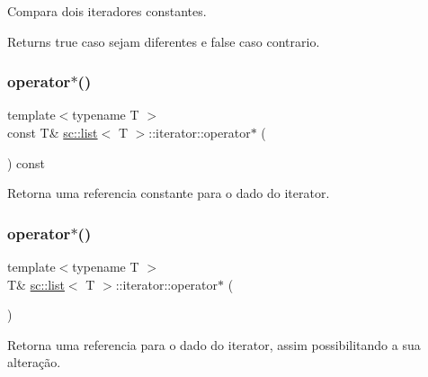 Compara dois iteradores constantes. \begin{DoxyReturn}{Returns}
true caso sejam diferentes e false caso contrario. 
\end{DoxyReturn}
\mbox{\label{classsc_1_1list_1_1iterator_a8e1feb979567a3fa27add54563d0008f}} 
\subsubsection{\texorpdfstring{operator$\ast$()}{operator*()}\hspace{0.1cm}{\footnotesize\ttfamily [1/2]}}
{\footnotesize\ttfamily template$<$typename T $>$ \\
const T\& \hyperlink{classsc_1_1list}{sc\+::list}$<$ T $>$\+::iterator\+::operator$\ast$ (\begin{DoxyParamCaption}{ }\end{DoxyParamCaption}) const\hspace{0.3cm}{\ttfamily [inline]}}

Retorna uma referencia constante para o dado do iterator. \mbox{\label{classsc_1_1list_1_1iterator_a2d9470370fc14c2a37ae35e52a086a6c}} 
\subsubsection{\texorpdfstring{operator$\ast$()}{operator*()}\hspace{0.1cm}{\footnotesize\ttfamily [2/2]}}
{\footnotesize\ttfamily template$<$typename T $>$ \\
T\& \hyperlink{classsc_1_1list}{sc\+::list}$<$ T $>$\+::iterator\+::operator$\ast$ (\begin{DoxyParamCaption}{ }\end{DoxyParamCaption})\hspace{0.3cm}{\ttfamily [inline]}}

Retorna uma referencia para o dado do iterator, assim possibilitando a sua alteração. \mbox{\label{classsc_1_1list_1_1iterator_aed5c46c8e0c470a9eccb5e47d0c80f4c}} 
